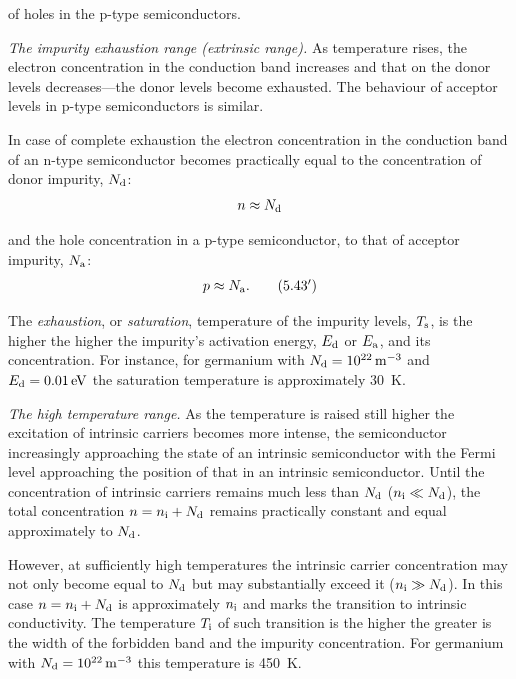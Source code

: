\noindent
of holes in the p-type semiconductors.

\textit{The impurity exhaustion range (extrinsic range).} As temperature rises, the electron concentration in the conduction band increases and that on the donor levels decreases---the donor levels become exhausted. The behaviour of acceptor levels in p-type semiconductors is similar.

In case of complete exhaustion the electron concentration in the conduction band of an n-type semiconductor becomes practically equal to the concentration of donor impurity, $N_{\text{d}}$:
\begin{equation}\label{eq:5_43}
    n \approx N_{\text{d}}
\end{equation}

\noindent
and the hole concentration in a p-type semiconductor, to that of acceptor impurity, $N_{\text{a}}$:
\begin{equation}\label{eq:5_43p}
    p \approx N_{\text{a}}.\tag{5.43$'$}
\end{equation}

\noindent
The \textit{exhaustion}, or \textit{saturation}, temperature of the impurity levels, $T_{\text{s}}$, is the higher the higher the impurity's activation energy, $E_{\text{d}}$ or $E_{\text{a}}$, and its concentration. For instance, for germanium with $N_{\text{d}}=\SI{e22}{\per\metre\cubed}$ and $E_{\text{d}}=\SI{0.01}{\electronvolt}$ the saturation temperature is approximately \SI{30}{\kelvin}.

\textit{The high temperature range.} As the temperature is raised still higher the excitation of intrinsic carriers becomes more intense, the semiconductor increasingly approaching the state of an intrinsic semiconductor with the Fermi level approaching the position of that in an intrinsic semiconductor. Until the concentration of intrinsic carriers remains much less than $N_{\text{d}}$ ($n_{\text{i}}\ll N_{\text{d}}$), the total concentration $n=n_{\text{i}}+N_{\text{d}}$ remains practically constant and equal approximately to $N_{\text{d}}$.

However, at sufficiently high temperatures the intrinsic carrier concentration may not only become equal to $N_{\text{d}}$ but may substantially exceed it ($n_{\text{i}}\gg N_{\text{d}}$). In this case $n=n_{\text{i}}+N_{\text{d}}$ is approximately $n_{\text{i}}$ and marks the transition to intrinsic conductivity. The temperature $T_{\text{i}}$ of such transition is the higher the greater is the width of the forbidden band and the impurity concentration.
For germanium with $N_{\text{d}}=\SI{e22}{\per\metre\cubed}$ this temperature is \SI{450}{\kelvin}.

